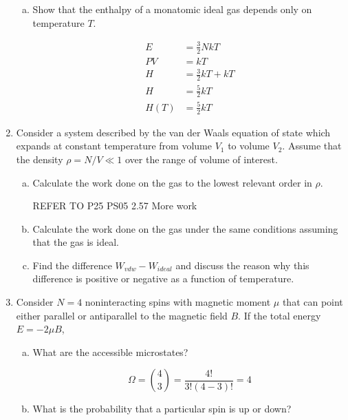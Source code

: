 \documentclass[9pt,a4paper,twocolumn]{article}
\begin{document}
\begin{enumerate}[1.]
\begin{enumerate}[(a)]
		\item Show that the enthalpy of a monatomic ideal gas depends only on temperature $T$.
		
		\begin{align}
			E &= \frac{3}{2}NkT \\
			PV &= kT \\
			H &= \frac{3}{2}kT + kT \\
			H &= \frac{5}{2}kT \\
			H(T) &= \frac{5}{2}kT
		\end{align}
	
	\end{enumerate}
	
	\item Consider a system described by the van der Waals equation of state which expands at constant temperature from volume $V_1$ to volume $V_2$. Assume that the density $\rho = N/V \ll 1$ over the range of volume of interest.
	\begin{enumerate}[(a)]
	
		\item Calculate the work done on the gas to the lowest relevant order in $\rho$.
		
		REFER TO P25 PS05 2.57 More work
		
		\item Calculate the work done on the gas under the same conditions assuming that the gas is ideal.
		
		\item Find the difference $W_{vdw} - W_{ideal}$ and discuss the reason why this difference is positive or negative as a function of temperature.	
	
	\end{enumerate}
	
	\item Consider $N=4$ noninteracting spins with magnetic moment $\mu$ that can point either parallel or antiparallel to the magnetic field $B$. If the total energy $E = -2\mu B$,
	\begin{enumerate}[(a)]
	
		\item What are the accessible microstates?
		
		\begin{equation}
			\Omega = \binom{4}{3} = \frac{4!}{3!(4-3)!} = 4
		\end{equation}
		
		\item What is the probability that a particular spin is up or down?
		

\end{enumerate}
\end{enumerate}
\end{document}

